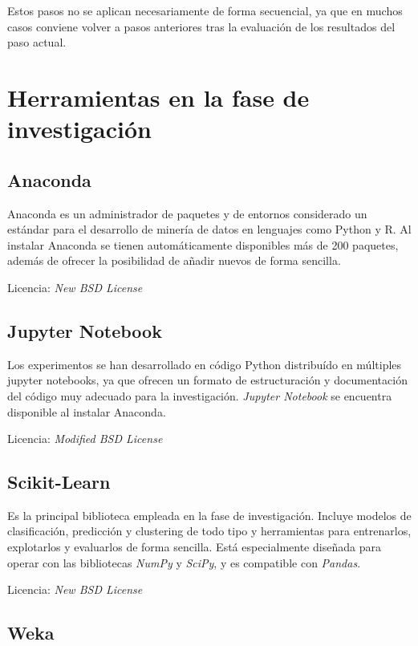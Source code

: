 Estos pasos no se aplican necesariamente de forma secuencial, ya que en muchos casos conviene volver a pasos anteriores tras la evaluación de los resultados del paso actual. 

\section{Herramientas en la fase de investigación}

\subsection{Anaconda}

Anaconda es un administrador de paquetes y de entornos considerado un estándar para el desarrollo de minería de datos en lenguajes como Python y R. Al instalar Anaconda se tienen automáticamente disponibles más de 200 paquetes, además de ofrecer la posibilidad de añadir nuevos de forma sencilla. 

Licencia: \textit{New BSD License}

\subsection{Jupyter Notebook}

Los experimentos se han desarrollado en código Python distribuído en múltiples jupyter notebooks, ya que ofrecen un formato de estructuración y documentación del código muy adecuado para la investigación. \textit{Jupyter Notebook} se encuentra disponible al instalar Anaconda. 

Licencia: \textit{Modified BSD License}


\subsection{Scikit-Learn}

Es la principal biblioteca empleada en la fase de investigación. Incluye modelos de clasificación, predicción y clustering de todo tipo y herramientas para entrenarlos, explotarlos y evaluarlos de forma sencilla. Está especialmente diseñada para operar con las bibliotecas \textit{NumPy} y \textit{SciPy}, y es compatible con \textit{Pandas}.

Licencia: \textit{New BSD License } 

\subsection{Weka}

